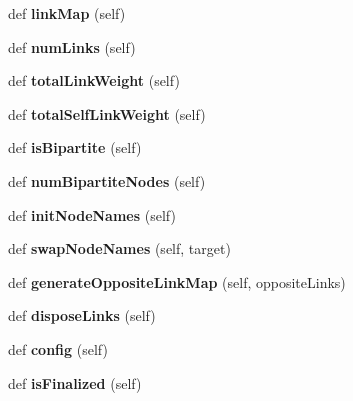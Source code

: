\begin{DoxyCompactItemize}
def {\bfseries link\+Map} (self)
\item 
\mbox{\label{classinfomap_1_1Network_a38c0652d788b9874f7866ea956bdc67b}} 
def {\bfseries num\+Links} (self)
\item 
\mbox{\label{classinfomap_1_1Network_a99f69ad0c42b3508e8db6c078afad4ad}} 
def {\bfseries total\+Link\+Weight} (self)
\item 
\mbox{\label{classinfomap_1_1Network_a14f93e73b1a7904f243f3fadae6e7c4a}} 
def {\bfseries total\+Self\+Link\+Weight} (self)
\item 
\mbox{\label{classinfomap_1_1Network_a772be5dd20af2312ff3135312aa4d71b}} 
def {\bfseries is\+Bipartite} (self)
\item 
\mbox{\label{classinfomap_1_1Network_a3a0b865300184e282a85994e558124d3}} 
def {\bfseries num\+Bipartite\+Nodes} (self)
\item 
\mbox{\label{classinfomap_1_1Network_afed2f715e9fa2d8586eca46a0e36e145}} 
def {\bfseries init\+Node\+Names} (self)
\item 
\mbox{\label{classinfomap_1_1Network_ae7b7cecfbd2351eea2a6d8459489a713}} 
def {\bfseries swap\+Node\+Names} (self, target)
\item 
\mbox{\label{classinfomap_1_1Network_a7538b1e3e80c8be5e75d4e922073d6aa}} 
def {\bfseries generate\+Opposite\+Link\+Map} (self, opposite\+Links)
\item 
\mbox{\label{classinfomap_1_1Network_a9b139458e0ec4e024e1cb5a7236dab7f}} 
def {\bfseries dispose\+Links} (self)
\item 
\mbox{\label{classinfomap_1_1Network_a3d5225eeea0507af1768cbc0fd82210a}} 
def {\bfseries config} (self)
\item 
\mbox{\label{classinfomap_1_1Network_adac0d74bc19eb09a3ec45a9c33a9c182}} 
def {\bfseries is\+Finalized} (self)
\end{DoxyCompactItemize}
